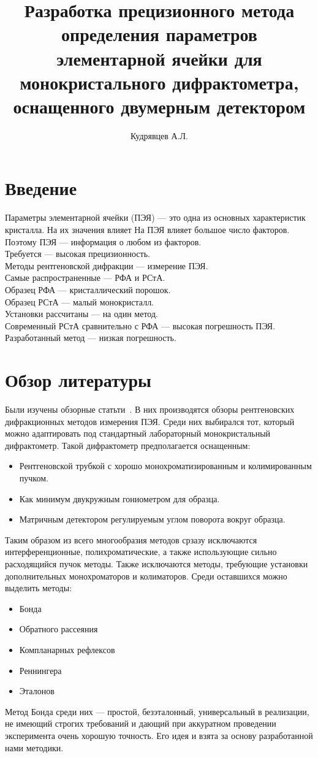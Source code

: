 \documentclass{article}
\author{Кудрявцев А.Л.}
\title{Разработка прецизионного метода определения параметров элементарной ячейки для монокристального дифрактометра, оснащенного двумерным детектором}
\begin{document}
\maketitle

\section{Введение}

Параметры элементарной ячейки (ПЭЯ) --- это одна из основных характеристик кристалла. На их значения влияет 
На ПЭЯ влияет большое число факторов. \\
Поэтому ПЭЯ --- информация о любом из факторов. \\
Требуется --- высокая прецизионность. \\
Методы рентгеновской дифракции --- измерение ПЭЯ. \\
Самые распространенные --- РФА и РСтА. \\
Образец РФА --- кристаллический порошок. \\
Образец РСтА --- малый монокристалл. \\
Установки рассчитаны --- на один метод. \\
Современный РСтА сравнительно с РФА --- высокая погрешность ПЭЯ. \\
Разработанный метод --- низкая погрешность.

\section{Обзор литературы}
Были изучены обзорные статьти~\cite{Lider:2020,galdecka2006x}.
В них производятся обзоры рентгеновских дифракционных методов измерения ПЭЯ.
Среди них выбирался тот, который можно адаптировать под стандартный лабораторный монокристальный дифрактометр.
Такой дифрактометр предполагается оснащенным:
\begin{itemize}
    \item Рентгеновской трубкой с хорошо монохроматизированным и колимированным пучком.
    \item Как минимум двукружным гониометром для образца.
    \item Матричным детектором регулируемым углом поворота вокруг образца.
\end{itemize}

Таким образом из всего многообразия методов срзазу исключаются интерференционные, полихроматические, а также использующие сильно расходящийся пучок методы. Также исключаются методы, требующие установки дополнительных монохроматоров и колиматоров.
Среди оставшихся можно выделить методы:
\begin{itemize}
    \item Бонда
    \item Обратного рассеяния
    \item Компланарных рефлексов
    \item Реннингера
    \item Эталонов
\end{itemize}
Метод Бонда среди них --- простой, безэталонный, универсальный в реализации, не имеющий строгих требований и дающий при аккуратном проведении эксперимента очень хорошую точность.
Его идея и взята за основу разработанной нами методики.
\end{document}
